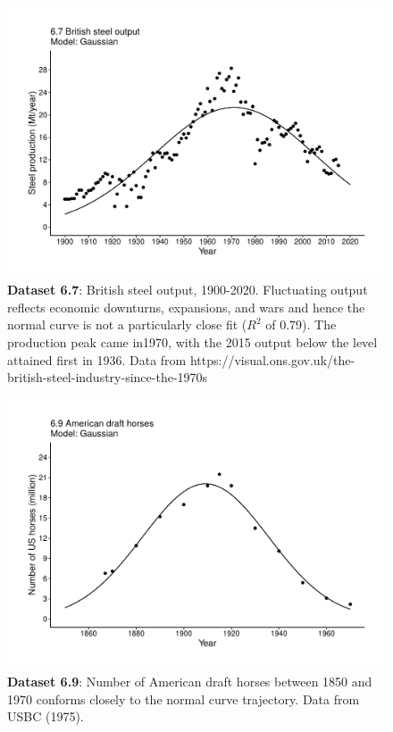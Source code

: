 \documentclass[aps,rmp,preprint,superscriptaddress,10pt,onecolumn]{article}
\begin{document}
\clearpage
\begin{figure}[h]
\includegraphics[width=\textwidth]{output/figs-ggplot/6.7.pdf}
\caption{\textbf{Dataset 6.7}: British steel output, 1900-2020. Fluctuating output reflects economic downturns, expansions, and wars and hence the normal curve is not a particularly close fit ($R^2$ of 0.79). The production peak came in1970, with the 2015 output below the level attained first in 1936. Data from https://visual.ons.gov.uk/the-british-steel-industry-since-the-1970s}
\end{figure}
	
\clearpage
\begin{figure}[h]
\includegraphics[width=\textwidth]{output/figs-ggplot/6.9.pdf}
\caption{\textbf{Dataset 6.9}: Number of American draft horses between 1850 and 1970 conforms closely to the normal curve trajectory. Data from USBC (1975). }
\end{figure}
	
\end{document}
